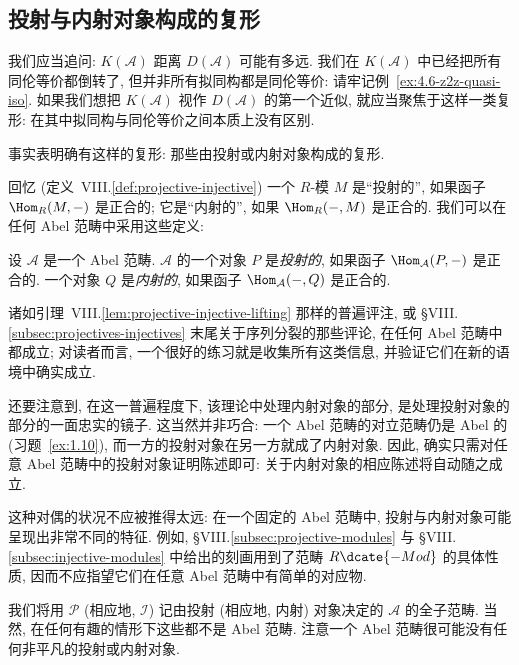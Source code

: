 \subsection{投射与内射对象构成的复形}
\label{subsec:5.3-proj-inj}

我们应当追问: $K(\mathcal{A})$ 距离 $D(\mathcal{A})$ 可能有多远. 我们在 $K(\mathcal{A})$ 中已经把所有同伦等价都倒转了, 但并非所有拟同构都是同伦等价: 请牢记例~\ref{ex:4.6-z2z-quasi-iso}. 如果我们想把 $K(\mathcal{A})$ 视作 $D(\mathcal{A})$ 的第一个近似, 就应当聚焦于这样一类复形: 在其中拟同构与同伦等价之间本质上没有区别.

\indent 事实表明确有这样的复形: 那些由投射或内射对象构成的复形.

\indent 回忆 (定义~VIII.\ref{def:projective-injective}) 一个 $R$-模 $M$ 是``投射的'', 如果函子 $\Hom_R(M,-)$ 是正合的; 它是``内射的'', 如果 $\Hom_R(-,M)$ 是正合的. 我们可以在任何 Abel 范畴中采用这些定义:

\begin{definition}\label{def:5.5-projective-injective}
设 $\mathcal{A}$ 是一个 Abel 范畴. $\mathcal{A}$ 的一个对象 $P$ 是\emph{投射的}, 如果函子 $\Hom_{\mathcal{A}}(P,-)$ 是正合的. 一个对象 $Q$ 是\emph{内射的}, 如果函子 $\Hom_{\mathcal{A}}(-,Q)$ 是正合的.
\end{definition}

\indent 诸如引理~VIII.\ref{lem:projective-injective-lifting} 那样的普遍评注, 或 §VIII.\ref{subsec:projectives-injectives} 末尾关于序列分裂的那些评论, 在任何 Abel 范畴中都成立; 对读者而言, 一个很好的练习就是收集所有这类信息, 并验证它们在新的语境中确实成立.

\indent 还要注意到, 在这一普遍程度下, 该理论中处理内射对象的部分, 是处理投射对象的部分的一面忠实的镜子. 这当然并非巧合: 一个 Abel 范畴的对立范畴仍是 Abel 的 (习题~\ref{ex:1.10}), 而一方的投射对象在另一方就成了内射对象. 因此, 确实只需对任意 Abel 范畴中的投射对象证明陈述即可: 关于内射对象的相应陈述将自动随之成立.

\indent 这种对偶的状况不应被推得太远: 在一个固定的 Abel 范畴中, 投射与内射对象可能呈现出非常不同的特征. 例如, §VIII.\ref{subsec:projective-modules} 与 §VIII.\ref{subsec:injective-modules} 中给出的刻画用到了范畴 $R\dcate{-Mod}$ 的具体性质, 因而不应指望它们在任意 Abel 范畴中有简单的对应物.

\indent 我们将用 $\mathcal{P}$ (相应地, $\mathcal{I}$) 记由投射 (相应地, 内射) 对象决定的 $\mathcal{A}$ 的全子范畴. 当然, 在任何有趣的情形下这些都不是 Abel 范畴. 注意一个 Abel 范畴很可能没有任何非平凡的投射或内射对象.

